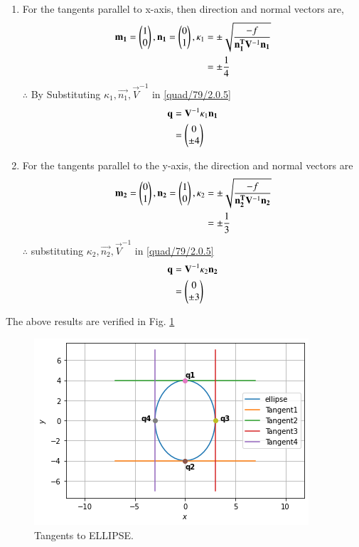 \begin{enumerate}
\item For the tangents  parallel to x-axis, then direction and normal vectors are,
\begin{align}
\mathbf{m_1} = \begin{pmatrix}1\\0\end{pmatrix},\mathbf{n_1} = \begin{pmatrix}0\\1\end{pmatrix},
\kappa_1 &=\pm \sqrt{\frac{-f}{\mathbf{n_1^T}\mathbf{V}^{-1}\mathbf{n_1}}} \\
 &=\pm\frac{1}{4}
\end{align}
$\therefore$ By Substituting $\kappa_1,\vec{n_1},\vec{V}^{-1}$ in \eqref{quad/79/2.0.5}
\begin{align}
\mathbf{q}&=\mathbf{V}^{-1}\kappa_1\mathbf{n_1} \\
&=\begin{pmatrix}0\\\pm4\end{pmatrix}
\end{align}
\item For the tangents  parallel to the y-axis, the direction and normal vectors are
\begin{align}
\mathbf{m_2} = \begin{pmatrix}0\\1\end{pmatrix},\mathbf{n_2} = \begin{pmatrix}1\\0\end{pmatrix},
\kappa_2 &=\pm \sqrt{\frac{-f}{\mathbf{n_2^T}\mathbf{V}^{-1}\mathbf{n_2}}} \\
 &=\pm\frac{1}{3}
\end{align}
$\therefore$ substituting $\kappa_2,\vec{n_2},\vec{V}^{-1}$ in \eqref{quad/79/2.0.5}
\begin{align}
\mathbf{q}&=\mathbf{V}^{-1}\kappa_2\mathbf{n_2} \\
&=\begin{pmatrix}0\\\pm3\end{pmatrix}
\end{align}
\end{enumerate}
The above results are verified in Fig.     \ref{quad/79/fig:Tangent to ELLIPSE.}
%
\begin{figure}[!ht]
    \centering
    \includegraphics[width=\columnwidth]{solutions/su2021/2/79/ELLIPSE.png}
    \caption{Tangents to ELLIPSE.}
    \label{quad/79/fig:Tangent to ELLIPSE.}
\end{figure}  

